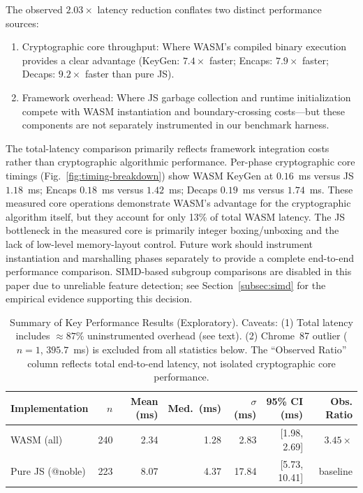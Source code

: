 \documentclass[11pt,a4paper]{article}
\def\textbf#1{#1}%
\def\emph#1{#1}%
\begin{document}
The observed $2.03\times$ latency reduction conflates two distinct performance sources:
\begin{enumerate}
    \item \textbf{Cryptographic core throughput:} Where WASM's compiled binary execution provides a clear advantage (KeyGen: $7.4\times$ faster; Encaps: $7.9\times$ faster; Decaps: $9.2\times$ faster than pure JS).
    \item \textbf{Framework overhead:} Where JS garbage collection and runtime initialization compete with WASM instantiation and boundary-crossing costs---but these components are \emph{not separately instrumented} in our benchmark harness.
\end{enumerate}

The total-latency comparison primarily reflects framework integration costs rather than cryptographic algorithmic performance. Per-phase cryptographic core timings (Fig.~\ref{fig:timing-breakdown}) show WASM KeyGen at $0.16$~ms versus JS $1.18$~ms; Encaps $0.18$~ms versus $1.42$~ms; Decaps $0.19$~ms versus $1.74$~ms. These measured core operations demonstrate WASM's advantage for the cryptographic algorithm itself, but they account for only 13\% of total WASM latency. The JS bottleneck in the measured core is primarily integer boxing/unboxing and the lack of low-level memory-layout control. Future work should instrument instantiation and marshalling phases separately to provide a complete end-to-end performance comparison. SIMD-based subgroup comparisons are disabled in this paper due to unreliable feature detection; see Section~\ref{subsec:simd} for the empirical evidence supporting this decision.

\begin{table}[htbp]
\centering
\caption{Summary of Key Performance Results (Exploratory). \textbf{Caveats:} (1) Total latency includes $\approx 87$\% uninstrumented overhead (see text). (2) Chrome~87 outlier ($n=1$, $395.7$~ms) is excluded from all statistics below. The ``Observed Ratio'' column reflects total end-to-end latency, not isolated cryptographic core performance.}
\label{tab:results}
\begin{tabular}{@{}lrrrrrr@{}}
\toprule
\textbf{Implementation} & \textbf{$n$} & \textbf{Mean (ms)} & \textbf{Med.\ (ms)} & \textbf{$\sigma$ (ms)} & \textbf{95\% CI (ms)} & \textbf{Obs. Ratio} \\
\midrule
WASM (all)          & 240  & 2.34  & 1.28  &   2.83 & [1.98, 2.69] & $3.45\times$ \\
Pure JS (@noble)    & 223  & 8.07  & 4.37  &  17.84 & [5.73, 10.41] & baseline \\
\bottomrule
\end{tabular}
\end{table}
\end{document}
